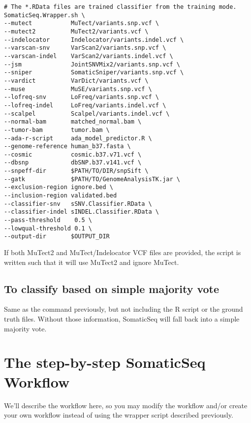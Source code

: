 \documentclass[10pt,letterpaper]{article}
\begin{document}
\begin{sloppypar}
\begin{lstlisting}
# The *.RData files are trained classifier from the training mode.
SomaticSeq.Wrapper.sh \
--mutect           MuTect/variants.snp.vcf \
--mutect2          MuTect2/variants.vcf \
--indelocator      Indelocator/variants.indel.vcf \
--varscan-snv      VarScan2/variants.snp.vcf \
--varscan-indel    VarScan2/variants.indel.vcf \
--jsm              JointSNVMix2/variants.snp.vcf \
--sniper           SomaticSniper/variants.snp.vcf \
--vardict          VarDict/variants.vcf \
--muse             MuSE/variants.snp.vcf \
--lofreq-snv       LoFreq/variants.snp.vcf \
--lofreq-indel     LoFreq/variants.indel.vcf \
--scalpel          Scalpel/variants.indel.vcf \
--normal-bam       matched_normal.bam \
--tumor-bam        tumor.bam \
--ada-r-script     ada_model_predictor.R \
--genome-reference human_b37.fasta \
--cosmic           cosmic.b37.v71.vcf \
--dbsnp            dbSNP.b37.v141.vcf \
--snpeff-dir       $PATH/TO/DIR/snpSift \
--gatk             $PATH/TO/GenomeAnalysisTK.jar \
--exclusion-region ignore.bed \
--inclusion-region validated.bed
--classifier-snv   sSNV.Classifier.RData \
--classifier-indel sINDEL.Classifier.RData \
--pass-threshold    0.5 \
--lowqual-threshold 0.1 \
--output-dir       $OUTPUT_DIR

\end{lstlisting}

If both MuTect2 and MuTect/Indelocator VCF files are provided, the script is written such that it will use MuTect2 and ignore MuTect.



\subsection{To classify based on simple majority vote}

Same as the command previously, but not including the R script or the ground truth files. Without those information, SomaticSeq will fall back into a simple majority vote.






\section{The step-by-step SomaticSeq Workflow}

We'll describe the workflow here, so you may modify the workflow and/or create your own workflow instead of using the wrapper script described previously. 



\end{sloppypar}
\end{document}
